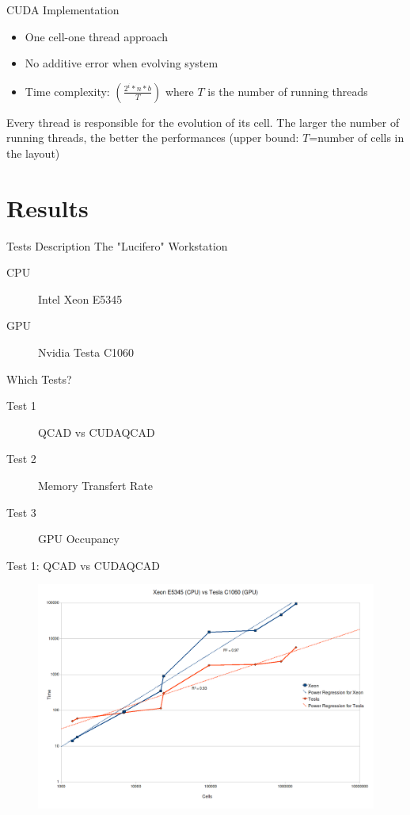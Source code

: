 \documentclass[10pt, red]{beamer}
\begin{document}
	\begin{frame}{CUDA Implementation}
		\begin{itemize}
			\item One cell-one thread approach
			\item No additive error when evolving system
			\item Time complexity: $(\frac{2^i*n*b}{T})$ where $T$ is the number of running threads
		\end{itemize}
		Every thread is responsible for the evolution of its cell. The larger the number of running threads, the better the performances (upper bound: $T$=number of cells in the layout)
	\end{frame}

\section{Results}

	\begin{frame}{Tests Description}
		The "Lucifero" Workstation
		\begin{description}
			\item[CPU] Intel Xeon E5345
			\item[GPU] Nvidia Testa C1060
		\end{description}
		Which Tests?
		\begin{description}
			\item[Test 1] QCAD vs CUDAQCAD
			\item[Test 2] Memory Transfert Rate
			\item[Test 3] GPU Occupancy
		\end{description}
	\end{frame}

	\begin{frame}{Test 1: QCAD vs CUDAQCAD}
	 	\begin{figure}
			\centering
			\includegraphics[width=\textwidth]{img/xeonvstesla}
	 	\end{figure} 
	\end{frame}
\end{document}
